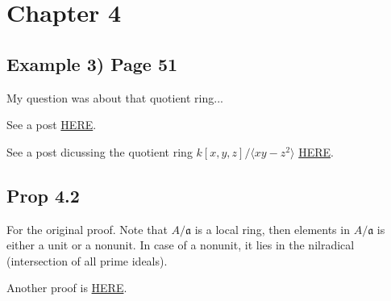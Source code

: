 \section{Chapter 4}

\subsection{Example 3) Page 51}

My question was about that quotient ring... 

See a post \href{https://math.stackexchange.com/questions/93478/is-each-power-of-a-prime-ideal-a-primary-ideal}{HERE}. 

See a post dicussing the quotient ring $k[x,y,z]/\langle xy-z^2\rangle$ \href{https://math.stackexchange.com/questions/3320367/mathbbcx-y-z-xy-z2-is-not-a-field}{HERE}. 

\subsection{Prop 4.2}

For the original proof. Note that $A/\mathfrak a$ is a local ring, then elements in $A/\mathfrak a$ is either a unit or a nonunit. In case of a nonunit, it lies in the nilradical (intersection of all prime ideals).

Another proof is \href{https://math.stackexchange.com/questions/649146/an-ideal-whose-radical-is-maximal-is-primary}{HERE}.